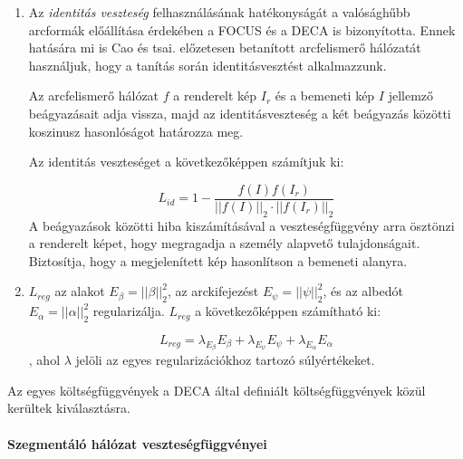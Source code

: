\documentclass[12pt,a4]{article}
\begin{document}
\begin{enumerate}
                \item Az \textit{identitás veszteség} felhasználásának hatékonyságát a valósághűbb arcformák előállítása érdekében a FOCUS és a DECA is bizonyította. Ennek hatására mi is Cao és tsai. \cite{pretrained-resnet} előzetesen betanított arcfelismerő hálózatát használjuk, hogy a tanítás során identitásvesztést alkalmazzunk.
                
                Az arcfelismerő hálózat $f$ a renderelt kép $I_{r}$ és a bemeneti kép $I$ jellemző beágyazásait adja vissza, majd az identitásveszteség a két beágyazás közötti koszinusz hasonlóságot határozza meg.

                Az identitás veszteséget a következőképpen számítjuk ki:

                \begin{equation}
                    L_{id} = 1 - \frac{f(I)f(I_{r})}{|| f(I) ||_{2} \cdot || f(I_{r}) ||_{2}}
                \end{equation}
                A beágyazások közötti hiba kiszámításával a veszteségfüggvény arra ösztönzi
                a renderelt képet, hogy megragadja a személy alapvető tulajdonságait.
                Biztosítja, hogy a megjelenített kép hasonlítson a bemeneti alanyra.
                
                \item $L_{reg}$ az alakot $E_{\beta} = ||\beta||_{2}^{2}$, az arckifejezést $E_{\psi} = ||\psi||_{2}^{2}$, és az albedót $E_{\alpha} = ||\alpha||_{2}^{2}$ regularizálja. $L_{reg}$ a következőképpen számítható ki:

                \begin{equation}
                    L_{reg} = \lambda_{E_{\beta}}E_{\beta} + \lambda_{E_{\psi}}E_{\psi} + \lambda_{E_{\alpha}}E_{\alpha} 
                \end{equation}
                , ahol $\lambda$ jelöli az egyes regularizációkhoz tartozó súlyértékeket.
                
            \end{enumerate}

            Az egyes költségfüggvények a DECA által definiált költségfüggvények közül kerültek kiválasztásra.
        
        \paragraph{Szegmentáló hálózat veszteségfüggvényei} \label{unetseg}
\end{document}
